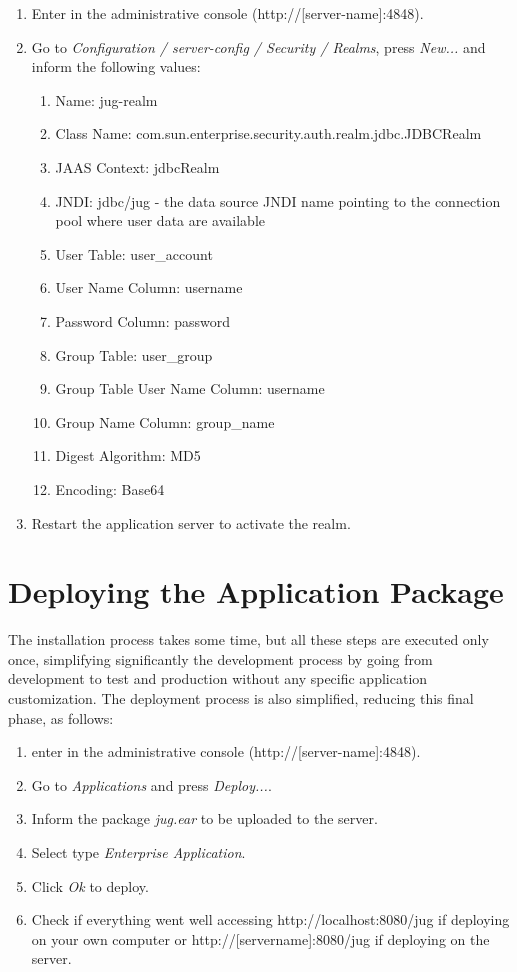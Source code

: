 \documentclass[envcountsame,envcountchap]{svmono}
\begin{document}
\begin{enumerate}
\item Enter in the administrative console (http://[server-name]:4848).
\item Go to \textit{Configuration / server-config / Security / Realms}, press \textit{New...} and inform the following values:
   \begin{enumerate}
   \item Name: jug-realm
   \item Class Name: com.sun.enterprise.security.auth.realm.jdbc.JDBCRealm
   \item JAAS Context: jdbcRealm
   \item JNDI: jdbc/jug - the data source JNDI name pointing to the connection pool where user data are available
   \item User Table: user\_account
   \item User Name Column: username
   \item Password Column: password
   \item Group Table: user\_group
   \item Group Table User Name Column: username
   \item Group Name Column: group\_name
   \item Digest Algorithm: MD5
   \item Encoding: Base64
   \end{enumerate}
\item Restart the application server to activate the realm.
\end{enumerate}

\section{Deploying the Application Package}

The installation process takes some time, but all these steps are executed only once, simplifying significantly the development process by going from development to test and production without any specific application customization. The deployment process is also simplified, reducing this final phase, as follows:

\begin{enumerate}
\item enter in the administrative console (http://[server-name]:4848).
\item Go to \textit{Applications} and press \textit{Deploy...}.
\item Inform the package \textit{jug.ear} to be uploaded to the server.
\item Select type \textit{Enterprise Application}.
\item Click \textit{Ok} to deploy.
\item Check if everything went well accessing http://localhost:8080/jug if deploying on your own computer or http://[servername]:8080/jug if deploying on the server.
\end{enumerate}
\end{document}
